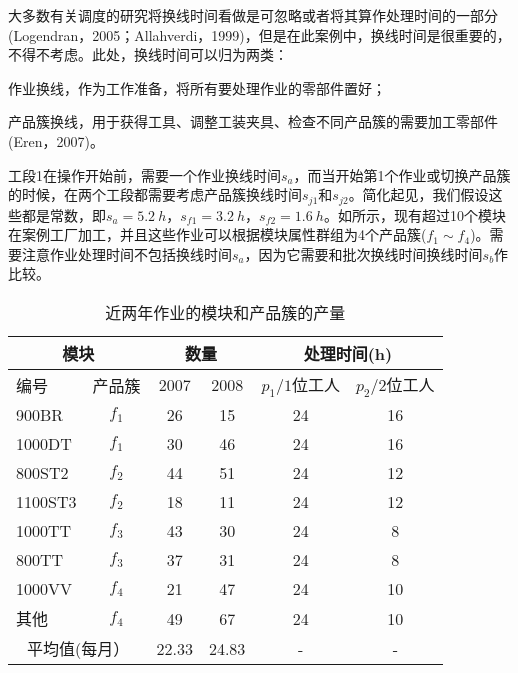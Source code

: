 大多数有关调度的研究将换线时间看做是可忽略或者将其算作处理时间的一部分(Logendran，2005；Allahverdi，1999)，但是在此案例中，换线时间是很重要的，不得不考虑。此处，换线时间可以归为两类：
\begin{inparaenum}
\item 作业换线，作为工作准备，将所有要处理作业的零部件置好；
\item 产品簇换线，用于获得工具、调整工装夹具、检查不同产品簇的需要加工零部件(Eren，2007)。
\end{inparaenum}
工段1在操作开始前，需要一个作业换线时间$s_a$，而当开始第1个作业或切换产品簇的时候，在两个工段都需要考虑产品簇换线时间$s_{j1}$和$s_{j2}$。简化起见，我们假设这些都是常数，即$s_a=5.2\ h$，$s_{f1}=3.2\ h$，$s_{f2}=1.6\ h$。如所示，现有超过10个模块在案例工厂加工，并且这些作业可以根据模块属性群组为4个产品簇($f_1\sim f_4$)。需要注意作业处理时间不包括换线时间$s_a$，因为它需要和批次换线时间换线时间$s_b$作比较。
\begin{table}[htbp]
  \centering\xiaowu
  \caption{近两年作业的模块和产品簇的产量}
    \begin{tabular}{lrcccc}
    \toprule
    \multicolumn{2}{c}{模块} & \multicolumn{2}{c}{数量} & \multicolumn{2}{c}{处理时间(h)} \\
    \midrule
    \multicolumn{1}{l}{编号} & \multicolumn{1}{c}{产品簇 } & 2007  & 2008  & $p_1/1$位工人 & $p_2/2$位工人 \\
    \midrule
    900BR & \multicolumn{1}{c}{$f_1$} & 26    & 15    & 24    & 16 \\
    1000DT & \multicolumn{1}{c}{$f_1$} & 30    & 46    & 24    & 16 \\
    800ST2 & \multicolumn{1}{c}{$f_2$} & 44    & 51    & 24    & 12 \\
    1100ST3 & \multicolumn{1}{c}{$f_2$} & 18    & 11    & 24    & 12 \\
    1000TT & \multicolumn{1}{c}{$f_3$} & 43    & 30    & 24    & 8 \\
    800TT & \multicolumn{1}{c}{$f_3$} & 37    & 31    & 24    & 8 \\
    1000VV & \multicolumn{1}{c}{$f_4$} & 21    & 47    & 24    & 10 \\
    其他 & \multicolumn{1}{c}{$f_4$} & 49    & 67    & 24    & 10 \\
    \multicolumn{2}{c}{平均值(每月）} & 22.33 & 24.83 & -     & - \\
    \bottomrule
    \end{tabular}%
  \label{tab:2yearproduction}%
\end{table}%

